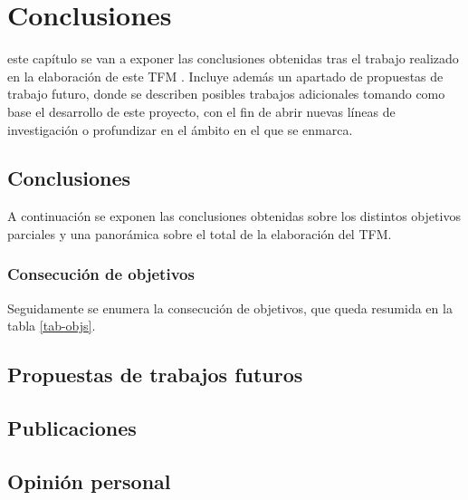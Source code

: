 \chapter{Conclusiones}
\label{chap:conclusiones}
 este capítulo se van a exponer las conclusiones obtenidas tras el trabajo
realizado
en la elaboración de este \acs{TFM} . Incluye además un apartado de propuestas de
trabajo
futuro, donde se describen posibles trabajos adicionales tomando como base el
desarrollo de
este proyecto, con el fin de abrir nuevas líneas de investigación o profundizar
en el ámbito
en el que se enmarca.

\section{Conclusiones}
A continuación se exponen las conclusiones obtenidas sobre los distintos
objetivos parciales y una panorámica sobre el total de la elaboración del
\acs{TFM}.

\subsection{Consecución de objetivos}
Seguidamente se enumera la consecución de objetivos, que queda resumida en la
tabla \ref{tab-objs}.




\section{Propuestas de trabajos futuros}
\section{Publicaciones}
\section{Opinión personal}
